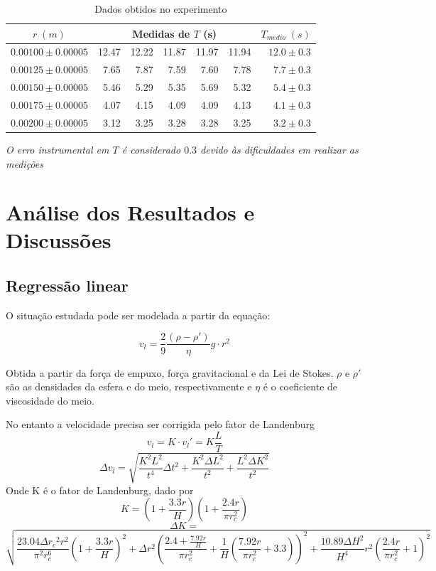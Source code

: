 \documentclass[12pt,a4paper]{article}
\begin{document}
\begin{table}[!htbp]

\centering
\def\arraystretch{1.5}
\caption{Dados obtidos no experimento}

\begin{tabular}{|c|rrrrr|r|}
\hline
$ r \; (m)$ & \multicolumn{5}{c|}{Medidas de $T$ \;  (s)} & $T_{medio} \; (s)$  \\
\hline
  $ 0.00100 \pm 0.00005 $ &12.47 & 12.22 & 11.87 & 11.97 & 11.94 & $ 12.0 \pm 0.3 $ \\
  \hline
  $ 0.00125 \pm 0.00005 $ &7.65 & 7.87 & 7.59 & 7.60 & 7.78  & $ 7.7 \pm 0.3 $   \\
  \hline
  $ 0.00150 \pm 0.00005 $ &5.46 & 5.29 & 5.35 & 5.69 & 5.32 & $ 5.4 \pm 0.3 $     \\
  \hline
  $ 0.00175 \pm 0.00005 $ &4.07 & 4.15 & 4.09 & 4.09 & 4.13  & $ 4.1 \pm 0.3 $    \\
  \hline
  $ 0.00200 \pm 0.00005 $ &3.12 & 3.25 & 3.28 & 3.28 & 3.25 & $ 3.2 \pm 0.3 $       \\
\hline
\end{tabular}

\emph{O erro instrumental em $T$ é considerado $0.3$ devido às dificuldades em realizar as medições}
\label{dados}
\end{table}




\section{Análise dos Resultados e Discussões}
\subsection{Regressão linear}
O situação estudada pode ser modelada a partir da equação: 

$$ v_l = \frac{2}{9} \frac{(\rho - \rho ')}{\eta}g \cdot r^2$$

Obtida a partir da força de empuxo, força gravitacional e da Lei de Stokes. $\rho$ e $\rho '$ são as densidades da esfera e do meio, respectivamente e $\eta$ é o coeficiente de viscosidade do meio.

No entanto a velocidade precisa ser corrigida pelo fator de Landenburg
$$ v_l = K \cdot v_l ' = K \frac{L}{T}$$
$$ \Delta v_l = \sqrt{\frac{K^{2} L^{2}}{t^{4}} \Delta{t}^{2} + \frac{K^{2} \Delta{L}^{2}}{t^{2}} + \frac{L^{2} \Delta{K}^{2}}{t^{2}}} $$
Onde K é o fator de Landenburg, dado por 
$$ K = \left(1 + \frac{3.3 r}{H}\right) \left(1 + \frac{2.4 r}{ \pi r_{c}^{2}}  \right) $$
$$ \Delta K = $$
$$\sqrt{\frac{23.04 \Delta{r_{c}}^{2} r^{2}}{\pi^{2} r_{c}^{6}} \left(1 + \frac{3.3 r}{H}\right)^{2} + \Delta{r}^{2} \left(\frac{2.4 + \frac{7.92 r}{H}}{\pi r_{c}^{2}} + \frac{1}{H} \left(\frac{7.92 r}{\pi r_{c}^{2}} + 3.3\right)\right)^{2} + \frac{10.89 \Delta{H}^{2}}{H^{4}} r^{2} \left(\frac{2.4 r}{\pi r_{c}^{2}} + 1\right)^{2}} $$
\end{document}
